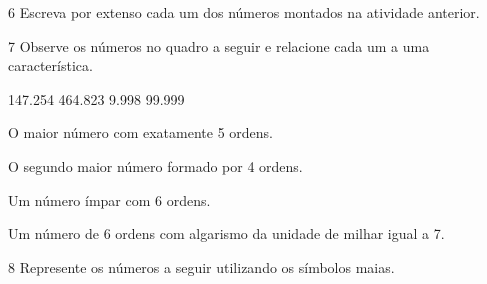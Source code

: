 \num{6} Escreva por extenso cada um dos números montados na atividade anterior.


\num{7} Observe os números no quadro a seguir e relacione cada um a uma característica.

\begin{mdframed}[linewidth=2pt,linecolor=azul!20,backgroundcolor=azul!20,roundcorner=2pt]
147.254 \hfill 464.823 \hfill 9.998 \hfill 99.999
\end{mdframed}

\begin{escolha}
\item O maior número com exatamente 5 ordens. 

\item O segundo maior número formado por 4 ordens. 

\item Um número ímpar com 6 ordens. 

\item Um número de 6 ordens com algarismo da unidade de milhar igual a 7. 
\end{escolha}

\num{8} Represente os números a seguir utilizando os símbolos maias.


